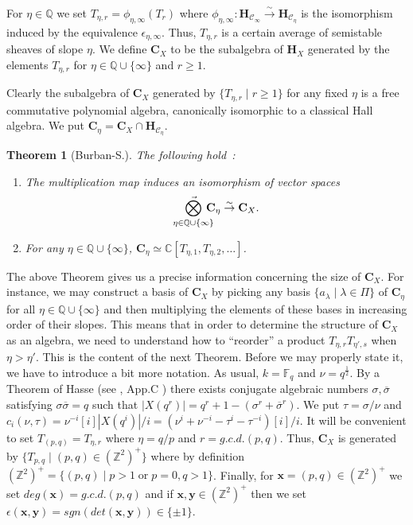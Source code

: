 \documentclass[a4paper,10pt]{amsart}
\def\Z{\mathbb{Z}}
\def\Q{\mathbb{Q}}
\def\H{\mathbf{H}}
\def\C{\mathbb{C}}
\def\CC{\mathbf{C}}
\newtheorem{theo}{\bf{Theorem}}[section]
\numberwithin{equation}{section}
\begin{document}
{For $\eta \in \Q$ we set $T_{\eta,r}=\phi_{\eta,\infty}(T_r)$ where $\phi_{\eta,\infty}: \H_{\mathcal{C}_{\infty}} \stackrel{\sim}{\to} \H_{\mathcal{C}_{\eta}}$ is the isomorphism induced by the equivalence $\epsilon_{\eta,\infty}$. Thus, $T_{\eta,r}$ is a certain average of semistable sheaves of slope $\eta$. We define $\CC_X$ to be the subalgebra of $\H_X$ generated by the elements $T_{\eta,r}$ for $\eta \in \Q\cup \{\infty\}$ and $r \geq 1$.

Clearly the subalgebra of $\CC_X$ generated by $\{T_{\eta,r}\;|\; r \geq 1\}$ for any fixed $\eta$ is a free commutative polynomial algebra, canonically isomorphic to a classical Hall algebra. We put $\CC_{\eta}=\CC_X \cap \H_{\mathcal{C}_{\eta}}$.

\vspace{.1in}

\begin{theo}[Burban-S.] The following hold~:
\begin{enumerate}
\item[i)] The multiplication map induces an isomorphism of vector spaces
$$\mathop{\vec{\bigotimes}}_{\eta \in \Q \cup \{\infty\}} \hspace{-.12in}\CC_{\eta} \stackrel{\sim}{\to} \CC_X.$$
\item[ii)] For any $\eta \in \Q \cup \{\infty\}$, $\CC_{\eta}\simeq \C[T_{\eta,1}, T_{\eta,2}, \ldots]$.
\end{enumerate}
\end{theo}

\vspace{.15in}

The above Theorem gives us a precise information concerning the size of $\CC_X$. For instance, we may construct a basis of $\CC_X$ by picking any basis $\{a_{\lambda}\;|\;\lambda \in \Pi\}$ of $\CC_{\eta}$ for all $\eta \in \Q \cup \{\infty\}$ and then multiplying the elements of these bases in increasing order of their slopes. This means that in order to determine the structure of $\CC_X$ as an algebra, we need to understand how to ``reorder'' a product $T_{\eta,r}T_{\eta',s}$ when $\eta>\eta'$. This is the content of the next Theorem. Before we may properly state it, we have to introduce a bit more notation. As usual, $k=\mathbb{F}_q$ and $\nu=q^{\frac{1}{2}}$. By a Theorem of Hasse (see \cite{Hart}, App.C ) there exists conjugate algebraic numbers $\sigma, \overline{\sigma}$ satisfying $\sigma \overline{\sigma}=q$ such that $|X(q^r)|=q^r+1-(\sigma^r+\overline{\sigma}^r)$. We put $\tau=\sigma/\nu$ and $c_i(\nu,\tau)=\nu^{-i}[i]|X(q^i)|/i=(\nu^i+\nu^{-i}-\tau^i-\tau^{-i})[i]/i$.
It will be convenient to set $T_{(p,q)}=T_{\eta,r}$ where $\eta=q/p$ and $r=g.c.d. (p,q)$. Thus, $\CC_X$ is generated by $\{T_{p,q}\;|\; (p,q) \in (\Z^{2})^+\}$ where by definition $(\Z^2)^+ =\{(p,q)\;|\; p>1\;\text{or}\;p=0, q>1\}$. Finally, for $\mathbf{x}=(p,q) \in (\Z^2)^+$ we set $deg(\mathbf{x})=g.c.d. (p,q)$ and if $\mathbf{x},\mathbf{y} \in (\Z^2)^+$ then we set $\epsilon(\mathbf{x},\mathbf{y})=sgn(det(\mathbf{x},\mathbf{y})) \in \{\pm 1\}$.

}
\end{document}
